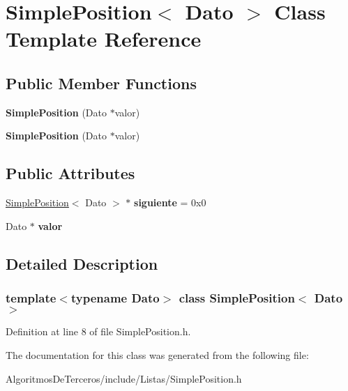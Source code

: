 \hypertarget{class_simple_position}{}\section{Simple\+Position$<$ Dato $>$ Class Template Reference}
\label{class_simple_position}
\subsection*{Public Member Functions}
\begin{DoxyCompactItemize}
\item 
\mbox{\label{class_simple_position_a6b6e102942c3cf1797735255897402b5}} 
{\bfseries Simple\+Position} (Dato $\ast$valor)
\item 
\mbox{\label{class_simple_position_a6b6e102942c3cf1797735255897402b5}} 
{\bfseries Simple\+Position} (Dato $\ast$valor)
\end{DoxyCompactItemize}
\subsection*{Public Attributes}
\begin{DoxyCompactItemize}
\item 
\mbox{\label{class_simple_position_ae54bf8eca4b292c6a81c826509a41655}} 
\hyperlink{class_simple_position}{Simple\+Position}$<$ Dato $>$ $\ast$ {\bfseries siguiente} = 0x0
\item 
\mbox{\label{class_simple_position_ab242d06a22b9d86aede312d321e652c2}} 
Dato $\ast$ {\bfseries valor}
\end{DoxyCompactItemize}


\subsection{Detailed Description}
\subsubsection*{template$<$typename Dato$>$\newline
class Simple\+Position$<$ Dato $>$}



Definition at line 8 of file Simple\+Position.\+h.



The documentation for this class was generated from the following file\+:\begin{DoxyCompactItemize}
\item 
Algoritmos\+De\+Terceros/include/\+Listas/Simple\+Position.\+h\end{DoxyCompactItemize}
